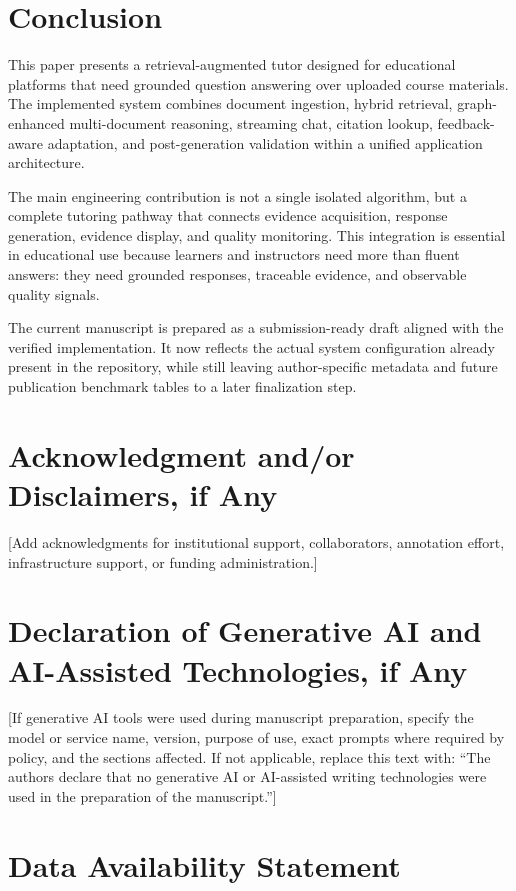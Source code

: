 \documentclass[11pt,a4paper]{article}
\begin{document}
\section{Conclusion}

This paper presents a retrieval-augmented tutor designed for educational platforms that need grounded question answering over uploaded course materials. The implemented system combines document ingestion, hybrid retrieval, graph-enhanced multi-document reasoning, streaming chat, citation lookup, feedback-aware adaptation, and post-generation validation within a unified application architecture.

The main engineering contribution is not a single isolated algorithm, but a complete tutoring pathway that connects evidence acquisition, response generation, evidence display, and quality monitoring. This integration is essential in educational use because learners and instructors need more than fluent answers: they need grounded responses, traceable evidence, and observable quality signals.

The current manuscript is prepared as a submission-ready draft aligned with the verified implementation. It now reflects the actual system configuration already present in the repository, while still leaving author-specific metadata and future publication benchmark tables to a later finalization step.

\section*{Acknowledgment and/or Disclaimers, if Any}

[Add acknowledgments for institutional support, collaborators, annotation effort, infrastructure support, or funding administration.]

\section*{Declaration of Generative AI and AI-Assisted Technologies, if Any}

[If generative AI tools were used during manuscript preparation, specify the model or service name, version, purpose of use, exact prompts where required by policy, and the sections affected. If not applicable, replace this text with: ``The authors declare that no generative AI or AI-assisted writing technologies were used in the preparation of the manuscript.'']

\section*{Data Availability Statement}
\end{document}
